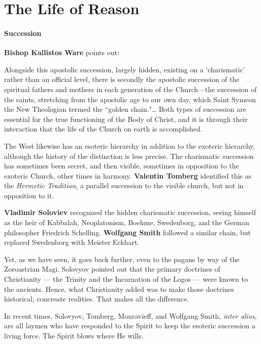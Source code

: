 \section{The Life of Reason}

\paragraph{Succession}
\textbf{Bishop Kallistos Ware} points out:

\begin{quotex}
Alongside this apostolic succession, largely hidden, existing on a `charismatic' rather than an official level, there is secondly the apostolic succession of the spiritual fathers and mothers in each generation of the Church—the succession of the saints, stretching from the apostolic age to our own day, which Saint Symeon the New Theologian termed the ``golden chain."… Both types of succession are essential for the true functioning of the Body of Christ, and it is through their interaction that the life of the Church on earth is accomplished. 

\end{quotex}
The West likewise has an esoteric hierarchy in addition to the exoteric hierarchy, although the history of the distinction is less precise. The charismatic succession has sometimes been secret, and then visible, sometimes in opposition to the exoteric Church, other times in harmony. \textbf{Valentin Tomberg} identified this as the \emph{Hermetic Tradition}, a parallel succession to the visible church, but not in opposition to it.

\textbf{Vladimir Soloviev} recognized the hidden charismatic succession, seeing himself as the heir of Kabbalah, Neoplatonism, Boehme, Swedenborg, and the German philosopher Friedrich Schelling. \textbf{Wolfgang Smith} followed a similar chain, but replaced Swedenborg with Meister Eckhart.

Yet, as we have seen, it goes back further, even to the pagans by way of the Zoroastrian Magi. Solovyov pointed out that the primary doctrines of Christianity — the Trinity and the Incarnation of the Logos — were known to the ancients. Hence, what Christianity added was to make those doctrines historical, concreate realities. That makes all the difference.

In recent times, Solovyov, Tomberg, Mouravieff, and Wolfgang Smith, \emph{inter alios}, are all laymen who have responded to the Spirit to keep the esoteric succession a living force. The Spirit blows where He wills.

